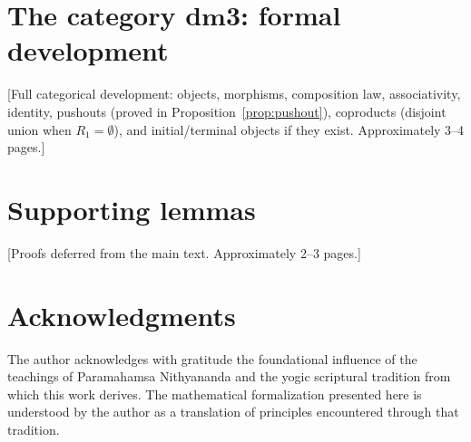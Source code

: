\documentclass[12pt, oneside]{book}
\theoremstyle{plain}
\theoremstyle{definition}
\theoremstyle{remark}
\newcommand{\dmcat}{\mathbf{dm3}}
\begin{document}
\appendix

\section{The category \texorpdfstring{$\dmcat$}{dm3}: formal development}
\label{app:cat}

[Full categorical development: objects, morphisms, composition law,
associativity, identity, pushouts (proved in
Proposition~\ref{prop:pushout}), coproducts (disjoint union when
$R_1=\emptyset$), and initial/terminal objects if they exist.
Approximately 3--4 pages.]

\section{Supporting lemmas}\label{app:lemmas}

[Proofs deferred from the main text. Approximately 2--3 pages.]

\section*{Acknowledgments}
The author acknowledges with gratitude the foundational influence
of the teachings of Paramahamsa Nithyananda and the yogic
scriptural tradition from which this work derives. The mathematical
formalization presented here is understood by the author as a
translation of principles encountered through that tradition.
\end{document}
